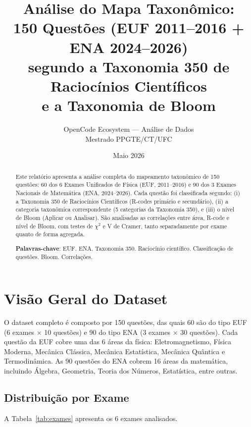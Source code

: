 \documentclass[12pt,a4paper]{article}
\title{\textbf{Análise do Mapa Taxonômico:}\\
\large 150 Questões (EUF 2011--2016 + ENA 2024--2026) \\
segundo a Taxonomia 350 de Raciocínios Científicos \\
e a Taxonomia de Bloom}
\author{OpenCode Ecosystem --- Análise de Dados\\
Mestrado PPGTE/CT/UFC}
\date{Maio 2026}
\begin{document}
\maketitle

\begin{abstract}
Este relatório apresenta a análise completa do mapeamento taxonômico de
150 questões: 60 dos 6 Exames Unificados de Física (EUF, 2011--2016) e
90 dos 3 Exames Nacionais de Matemática (ENA, 2024--2026).
Cada questão foi classificada segundo: (i) a Taxonomia 350 de Raciocínios
Científicos (R-codes primário e secundário), (ii) a categoria taxonômica
correspondente (5 categorias da Taxonomia 350), e (iii) o nível de Bloom
(Aplicar ou Analisar). São analisadas as correlações entre área,
R-code e nível de Bloom, com testes de $\chi^2$ e V de Cramer, tanto
separadamente por exame quanto de forma agregada.
\vspace{0.3cm}

\noindent\textbf{Palavras-chave}: EUF. ENA. Taxonomia 350. Raciocínio científico.
Classificação de questões. Bloom. Correlações.
\end{abstract}

\tableofcontents
\newpage

\section{Visão Geral do Dataset}

O dataset completo é composto por 150 questões, das quais 60 são do
tipo EUF (6 exames $\times$ 10 questões) e 90 do tipo ENA
(3 exames $\times$ 30 questões). Cada questão da EUF cobre
uma das 6 áreas da física: Eletromagnetismo, Física Moderna, Mecânica
Clássica, Mecânica Estatística, Mecânica Quântica e Termodinâmica.
As 90 questões do ENA cobrem 16 áreas da matemática, incluindo
Álgebra, Geometria, Teoria dos Números, Estatística, entre outras.

\subsection{Distribuição por Exame}

A Tabela~\ref{tab:exames} apresenta os 6 exames analisados.
\end{document}
